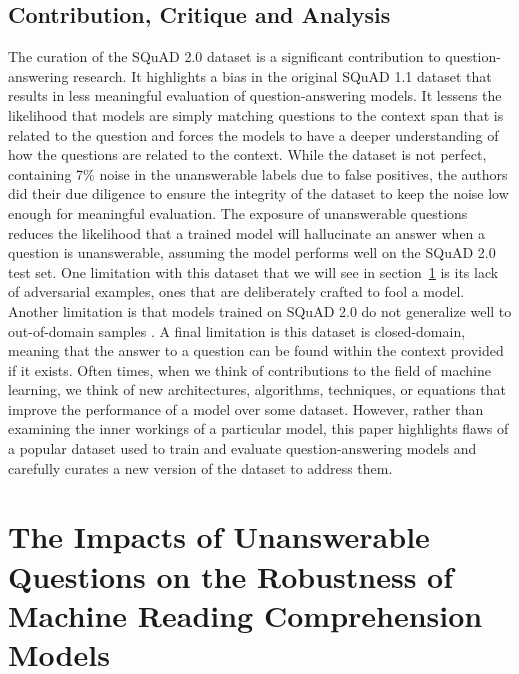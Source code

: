 \documentclass[letterpaper, 11pt]{article}
\begin{document}
\subsection{Contribution, Critique and Analysis}
The curation of the SQuAD 2.0 dataset is a significant contribution to question-answering research. It highlights a bias in the original SQuAD 1.1 dataset that results in less meaningful evaluation of question-answering models. 
It lessens the likelihood that models are simply matching questions to the context span that is related to the question and forces the models to have a deeper understanding of how the questions are related to the context.
While the dataset is not perfect, containing 7\% noise in the unanswerable labels due to false positives, the authors did their due diligence to ensure the integrity of the dataset to keep the noise low enough for meaningful evaluation.  
The exposure of unanswerable questions reduces the likelihood that a trained model will hallucinate an answer when a question is unanswerable, assuming the model performs well on the SQuAD 2.0 test set. 
One limitation with this dataset that we will see in section~\ref{subsec:impacts-of-unanswerable-questions-on-the-robustness-of-machine-reading-comprehension-models} is its lack of adversarial examples, ones that are deliberately crafted to fool a model. 
Another limitation is that models trained on SQuAD 2.0 do not generalize well to out-of-domain samples \citep{sulem2021}. A final limitation is this dataset is closed-domain, meaning that the answer to a question can be found within the context provided if it exists.
Often times, when we think of contributions to the field of machine learning, we think of new architectures, algorithms, techniques, or equations that improve the performance of a model over some dataset. However, rather than examining the inner workings of a particular model, this paper highlights flaws of a popular dataset used to train and evaluate question-answering models and carefully curates a new version of the dataset to address them.


\section{The Impacts of Unanswerable Questions on the Robustness of Machine
Reading Comprehension Models}
\label{subsec:impacts-of-unanswerable-questions-on-the-robustness-of-machine-reading-comprehension-models}
\end{document}
